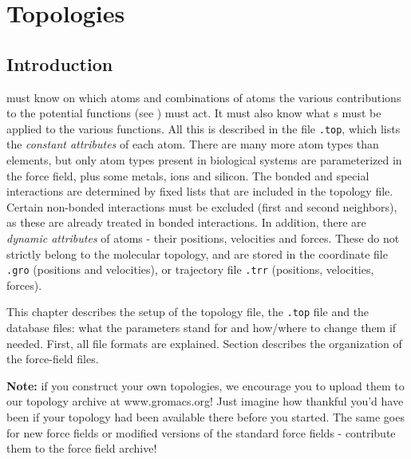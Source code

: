 %
% 
% 
% 
% 
% 
% 
% 
% 
%

\chapter{Topologies}
\label{ch:top}
\section{Introduction}
{\gromacs} must know on which atoms and combinations of atoms the
various contributions to the potential functions (see
) must act. It must
also know what s must be applied to the various
functions. All this is described in the {\em {}} file
{\tt *.top}, which lists the {\em constant attributes} of each atom.
There are many more atom types than elements, but only atom types
present in biological systems are parameterized in the force field,
plus some metals, ions and silicon. The bonded and special
interactions are determined by fixed lists that are included in the
topology file. Certain non-bonded interactions must be excluded (first
and second neighbors), as these are already treated in bonded
interactions.  In addition, there are {\em dynamic attributes} of
atoms - their positions, velocities and forces. These do not
strictly belong to the molecular topology, and are stored in the
coordinate file {\tt *.gro} (positions and velocities), or trajectory
file {\tt *.trr} (positions, velocities, forces).

This chapter describes the setup of the topology file, the
{\tt *.top} file and the database files: what the parameters
stand for and how/where to change them if needed.
First, all file formats are explained.
Section  describes the organization of
the force-field files.

{\bf Note:} if you construct your own topologies, we encourage you
to upload them to our topology archive at www.gromacs.org! Just imagine
how thankful you'd have been if your topology had been available
there before you started. The same goes for new force fields or
modified versions of the standard force fields - contribute them
to the force field archive!

